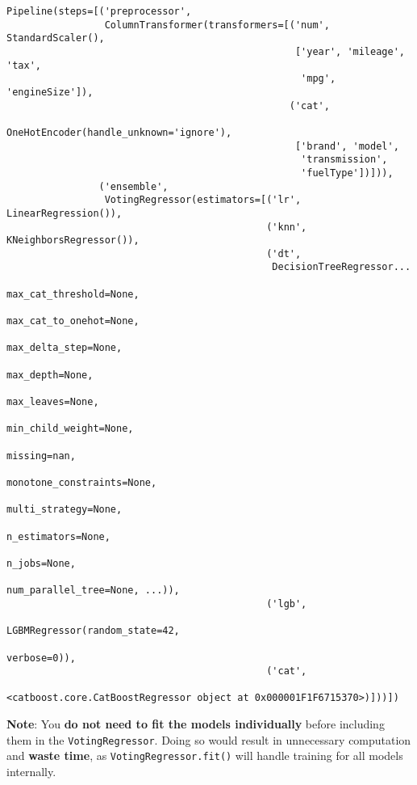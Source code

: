 \documentclass[
  letterpaper,
  DIV=11,
  numbers=noendperiod]{scrreprt}
\begin{document}
\begin{verbatim}
Pipeline(steps=[('preprocessor',
                 ColumnTransformer(transformers=[('num', StandardScaler(),
                                                  ['year', 'mileage', 'tax',
                                                   'mpg', 'engineSize']),
                                                 ('cat',
                                                  OneHotEncoder(handle_unknown='ignore'),
                                                  ['brand', 'model',
                                                   'transmission',
                                                   'fuelType'])])),
                ('ensemble',
                 VotingRegressor(estimators=[('lr', LinearRegression()),
                                             ('knn', KNeighborsRegressor()),
                                             ('dt',
                                              DecisionTreeRegressor...
                                                           max_cat_threshold=None,
                                                           max_cat_to_onehot=None,
                                                           max_delta_step=None,
                                                           max_depth=None,
                                                           max_leaves=None,
                                                           min_child_weight=None,
                                                           missing=nan,
                                                           monotone_constraints=None,
                                                           multi_strategy=None,
                                                           n_estimators=None,
                                                           n_jobs=None,
                                                           num_parallel_tree=None, ...)),
                                             ('lgb',
                                              LGBMRegressor(random_state=42,
                                                            verbose=0)),
                                             ('cat',
                                              <catboost.core.CatBoostRegressor object at 0x000001F1F6715370>)]))])
\end{verbatim}

\textbf{Note}: You \textbf{do not need to fit the models individually}
before including them in the \texttt{VotingRegressor}. Doing so would
result in unnecessary computation and \textbf{waste time}, as
\texttt{VotingRegressor.fit()} will handle training for all models
internally.
\end{document}
